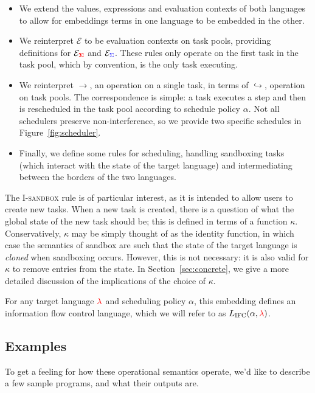 \documentclass{sigplanconf}
\newcommand{\Red}[1]{{\color{red} #1}}
\begin{document}
\begin{itemize}
    \item We extend the values, expressions and evaluation contexts of both languages to allow for embeddings terms in one language to be embedded in the other.
    \item We reinterpret \ensuremath{\mathcal{E}} to be evaluation contexts on task pools, providing definitions for $\mathcal{E}_{\mathbf{\color{red} \Sigma}}$ and $\mathcal{E}_{{\color{blue} \Sigma}}$.  These rules only operate on the first task in the task pool, which by convention, is the only task executing.
    \item We reinterpret \ensuremath{\rightarrow}, an operation on a single task, in terms of \ensuremath{\hookrightarrow}, operation on task pools.  The correspondence is simple: a task executes a step and then is rescheduled in the task pool according to schedule policy $\alpha$.  Not all schedulers preserve non-interference, so we provide two specific schedules in Figure~\ref{fig:scheduler}.
    \item Finally, we define some rules for scheduling, handling sandboxing tasks (which interact with the state of the target language) and intermediating between the borders of the two languages.
\end{itemize}

The \textsc{I-sandbox} rule is of particular interest, as it is intended to allow users
to create new tasks.  When a new task is created, there is a question of what the
global state of the new task should be; this is defined in terms of a function $\kappa$.
Conservatively, $\kappa$ may be simply thought of as the identity function, in which
case the semantics of sandbox are such that the state of the target language is \emph{cloned}
when sandboxing occurs.  However, this is not necessary: it is also valid for $\kappa$
to remove entries from the state.  In Section~\ref{sec:concrete}, we give a more detailed
discussion of the implications of the choice of $\kappa$.

For any target language \ensuremath{\Red{\lambda}} and scheduling policy \ensuremath{\alpha}, this
embedding defines an information flow control language, which we will
refer to as \ensuremath{L_\text{IFC}(\alpha,\Red{\lambda})}.

\subsection{Examples}

To get a feeling for how these operational semantics operate, we'd like to
describe a few sample programs, and what their outputs are.
\end{document}
